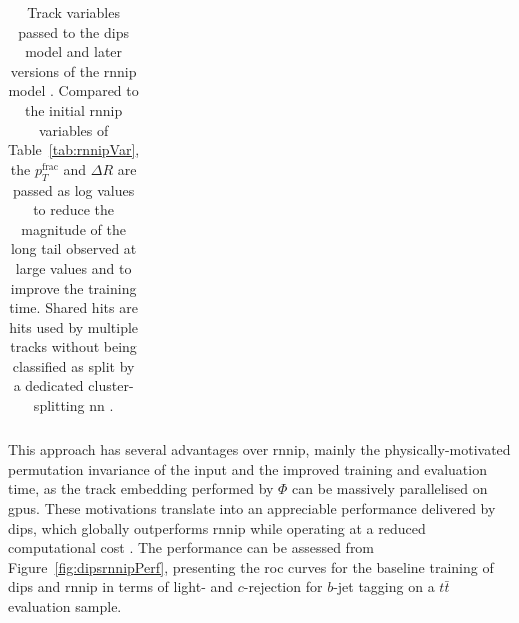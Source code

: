 \begin{table}[h]
\begin{center}
\begin{tabular}{C{3cm}|C{13cm}}
      \end{tabular}
      \caption{Track variables passed to the \gls{dips} model and later versions of the \gls{rnnip} model \cite{ATL-PHYS-PUB-2020-014}. Compared to the initial \gls{rnnip} variables of Table~\ref{tab:rnnipVar}, the $p_T^{\textrm{frac}}$ and $\Delta R$ are passed as log values to reduce the magnitude of the long tail observed at large values and to improve the training time. Shared hits are hits used by multiple tracks without being classified as split by a dedicated cluster-splitting \gls{nn} \cite{ATLAS-tracks-algo}.}
    \label{tab:dipsVar}
  \end{center}
\end{table}

This approach has several advantages over \gls{rnnip}, mainly the physically-motivated permutation invariance of the input and the improved training and evaluation time, as the track embedding performed by $\Phi$ can be massively parallelised on \glspl{gpu}. These motivations translate into an appreciable performance delivered by \gls{dips}, which globally outperforms \gls{rnnip} while operating at a reduced computational cost \cite{ATL-PHYS-PUB-2020-014}. The performance can be assessed from Figure~\ref{fig:dipsrnnipPerf}, presenting the \gls{roc} curves for the baseline training of \gls{dips} and \gls{rnnip} in terms of light- and $c$-rejection for $b$-jet tagging on a $t\bar{t}$ evaluation sample. \\

